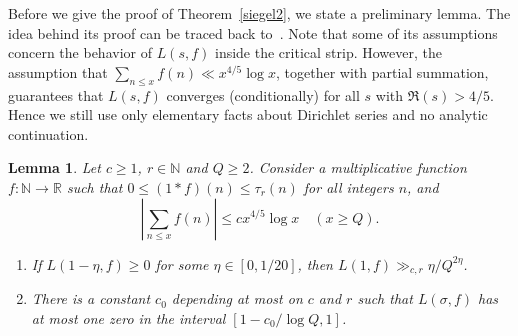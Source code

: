 \documentclass[12pt]{amsart}
\newtheorem{lemma}[theorem]{Lemma}
\theoremstyle{remark}
\newcommand {\SN} {{\mathbb N}}
\newcommand {\SR} {{\mathbb R}}
\numberwithin{equation}{section}
\begin{document}
Before we give the proof of Theorem~\ref{siegel2}, we state a preliminary lemma. The idea behind its proof can be traced back to~\cite{Pi73,Pi76}. Note that some of its assumptions concern the behavior of $L(s,f)$ inside the critical strip. However, the assumption that $\sum_{n\le x}f(n)\ll x^{4/5}\log x$, together with partial summation, guarantees that $L(s,f)$ converges (conditionally) for all $s$ with $\Re(s)>4/5$. Hence we still use only elementary facts about Dirichlet series and no analytic continuation.
\begin{lemma}\label{zerol1} Let $c\ge1$, $r\in\SN$ and $Q\ge2$. Consider a multiplicative function $f:\SN\to\SR$ such that $0\le(1*f)(n)\le\tau_r(n)$ for all integers $n$, and
$$
\left|\sum_{n\le x}f(n)\right|\le cx^{4/5}\log x\quad(x\ge Q).
$$
\begin{enumerate}
\item  If $L(1-\eta,f)\ge0$ for some $\eta\in[0,1/20]$, then $L(1,f)\gg_{c,r}\eta/Q^{2\eta}$.
\item There is a constant $c_0$ depending at most on $c$ and $r$ such that $L(\sigma,f)$ has at most one zero in the interval $[1-c_0/\log Q,1]$.
\end{enumerate}
\end{lemma}
\end{document}
